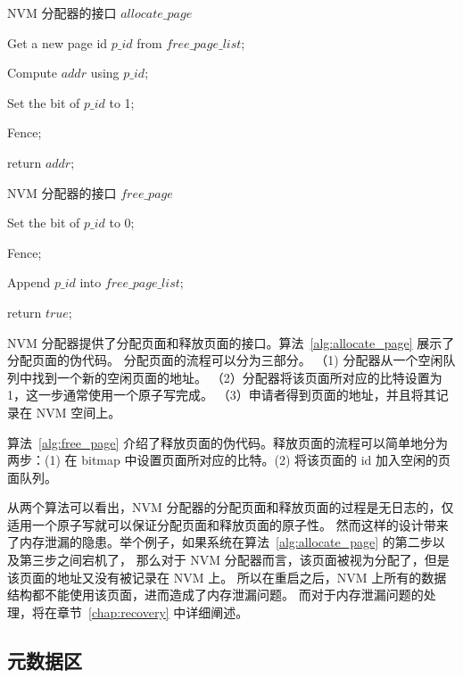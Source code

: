 \begin{algorithm}[t]
    \caption{NVM 分配器的接口 $allocate\_page$}
    \label{alg:allocate_page}
    \BlankLine

    Get a new page id $p\_id$ from $free\_page\_list$;

    Compute $addr$ using $p\_id$;

    Set the bit of $p\_id$ to 1;

    Fence;

    return $addr$;

\end{algorithm}

\begin{algorithm}[t]
    \caption{NVM 分配器的接口 $free\_page$}
    \label{alg:free_page}
    \BlankLine
    Set the bit of $p\_id$ to 0;

    Fence;

    Append $p\_id$ into $free\_page\_list$;

    return $true$;

\end{algorithm}


NVM 分配器提供了分配页面和释放页面的接口。算法~\ref{alg:allocate_page} 展示了分配页面的伪代码。
分配页面的流程可以分为三部分。
（1) 分配器从一个空闲队列中找到一个新的空闲页面的地址。
（2）分配器将该页面所对应的比特设置为 1，这一步通常使用一个原子写完成。
（3）申请者得到页面的地址，并且将其记录在 NVM 空间上。

算法~\ref{alg:free_page} 介绍了释放页面的伪代码。释放页面的流程可以简单地分为两步：(1) 在 bitmap 中设置页面所对应的比特。(2) 将该页面的 id 加入空闲的页面队列。

从两个算法可以看出，NVM 分配器的分配页面和释放页面的过程是无日志的，仅适用一个原子写就可以保证分配页面和释放页面的原子性。
然而这样的设计带来了内存泄漏的隐患。举个例子，如果系统在算法~\ref{alg:allocate_page} 的第二步以及第三步之间宕机了，
那么对于 NVM 分配器而言，该页面被视为分配了，但是该页面的地址又没有被记录在 NVM 上。
所以在重启之后，NVM 上所有的数据结构都不能使用该页面，进而造成了内存泄漏问题。
而对于内存泄漏问题的处理，将在章节~\ref{chap:recovery} 中详细阐述。

\subsection{元数据区}

